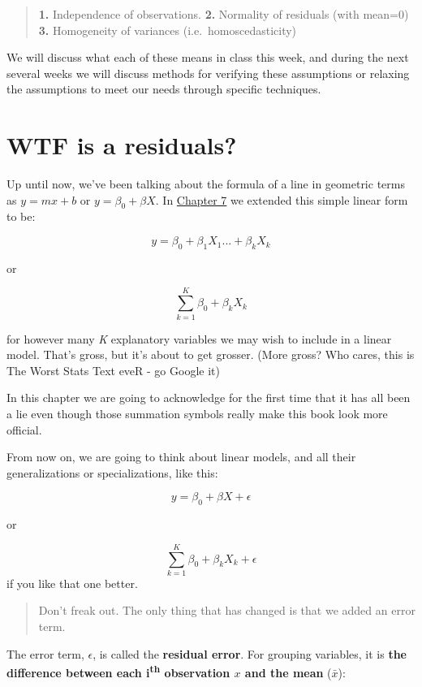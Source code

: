 \documentclass[
]{book}
\begin{document}
\begin{quote}
\textbf{1.} Independence of observations.
\textbf{2.} Normality of residuals (with mean=0)
\textbf{3.} Homogeneity of variances (i.e.~homoscedasticity)
\end{quote}

We will discuss what each of these means in class this week, and during the next several weeks we will discuss methods for verifying these assumptions or relaxing the assumptions to meet our needs through specific techniques.

\hypertarget{ughmath}{%
\section{WTF is a residuals?}\label{ughmath}}

Up until now, we've been talking about the formula of a line in geometric terms as \(y = mx + b\) or \(y = \beta_0 + \beta X\). In \protect\hyperlink{Chapter7}{Chapter 7} we extended this simple linear form to be:

\[y = \beta_0 + \beta_1 X_1 ... + \beta_k X_k\]

or

\[\sum_{k=1}^{K} \beta_0 + \beta_k X_k\]

for however many \emph{K} explanatory variables we may wish to include in a linear model. That's gross, but it's about to get grosser. (More gross? Who cares, this is The Worst Stats Text eveR - go Google it)

In this chapter we are going to acknowledge for the first time that it has all been a lie even though those summation symbols really make this book look more official.

From now on, we are going to think about linear models, and all their generalizations or specializations, like this:

\[y = \beta_0 + \beta X + \epsilon\]

or

\[\sum_{k=1}^{K} \beta_0 + \beta_k X_k + \epsilon\]
if you like that one better.

\begin{quote}
Don't freak out. The only thing that has changed is that we added an error term.
\end{quote}

The error term, \(\epsilon\), is called the \textbf{residual error}. For grouping variables, it is \textbf{the difference between each i\textsuperscript{th} observation \(x\) and the mean} (\(\bar{x}\)):
\end{document}
